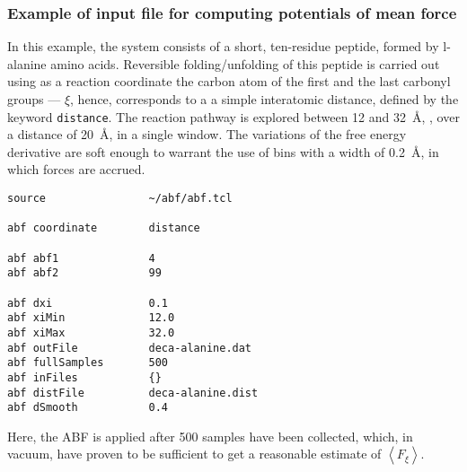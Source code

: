 \subsubsection{Example of input file for computing potentials of mean force}


In this example,
the system consists of a short,
ten-residue peptide, formed by {\sc l}-alanine amino acids.
Reversible folding/unfolding of
this peptide is carried out using as a reaction coordinate the carbon
atom of the first and the last carbonyl groups --- $\xi$, hence,
corresponds to a a simple interatomic distance, defined by the
keyword {\tt distance}. The reaction pathway is explored between
12 and 32~\AA, \ie, over a distance of 20~\AA, in a single window.
The variations of the free energy derivative are soft enough to warrant
the use of bins with a width of 0.2~\AA, in which forces are accrued.


\begin{verbatim}
source                ~/abf/abf.tcl

abf coordinate        distance

abf abf1              4
abf abf2              99

abf dxi               0.1
abf xiMin             12.0
abf xiMax             32.0
abf outFile           deca-alanine.dat
abf fullSamples       500
abf inFiles           {}
abf distFile          deca-alanine.dist
abf dSmooth           0.4
\end{verbatim}


Here, the ABF is applied after 500 samples have been
collected, which, in vacuum, have proven to be sufficient
to get a reasonable estimate of $\left\langle F_\xi \right\rangle$.

